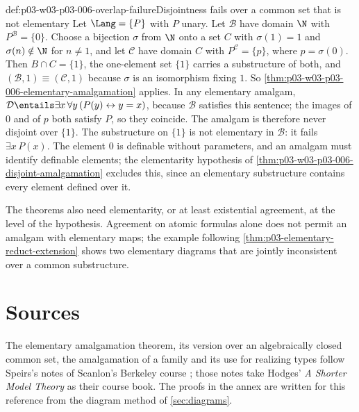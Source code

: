 \begin{hbwarning}{def:p03-w03-p03-006-overlap-failure}{Disjointness fails over a common set that is not elementary}
Let \(\Lang=\{P\}\) with \(P\) unary.  Let \(\mathcal B\) have domain
\(\N\) with \(P^{\mathcal B}=\{0\}\).  Choose a bijection \(\sigma\) from
\(\N\) onto a set \(C\) with \(\sigma(1)=1\) and \(\sigma(n)\notin\N\) for
\(n\ne 1\), and let \(\mathcal C\) have domain \(C\) with
\(P^{\mathcal C}=\{p\}\), where \(p=\sigma(0)\).  Then \(B\cap C=\{1\}\),
the one-element set \(\{1\}\) carries a substructure of both, and
\((\mathcal B,1)\equiv(\mathcal C,1)\) because \(\sigma\) is an isomorphism
fixing \(1\).  So
\cref{thm:p03-w03-p03-006-elementary-amalgamation} applies.  In any
elementary amalgam, \(\mathcal D\entails\exists x\,\forall y\,(P(y)\leftrightarrow y=x)\),
because \(\mathcal B\) satisfies this sentence; the images of \(0\) and of
\(p\) both satisfy \(P\), so they coincide.  The amalgam is therefore never
disjoint over \(\{1\}\).  The substructure on \(\{1\}\) is not elementary in
\(\mathcal B\): it fails \(\exists x\,P(x)\).  The element \(0\) is
definable without parameters, and an amalgam must identify definable
elements; the elementarity hypothesis of
\cref{thm:p03-w03-p03-006-disjoint-amalgamation} excludes this, since an
elementary substructure contains every element defined over it.
\end{hbwarning}

The theorems also need elementarity, or at least existential agreement, at
the level of the hypothesis.  Agreement on atomic formulas alone does not
permit an amalgam with elementary maps; the example following
\cref{thm:p03-elementary-reduct-extension} shows two elementary diagrams
that are jointly inconsistent over a common substructure.

\section{Sources}
\label{sec:p03-w03-p03-006-sources}

The elementary amalgamation theorem, its version over an algebraically
closed common set, the amalgamation of a family and its use for realizing
types follow Speirs's notes of Scanlon's Berkeley course
\cite[Lecture~19, pp.~1--6]{Speirs2013Amalgamation}; those notes take
Hodges' \emph{A Shorter Model Theory} as their course book.  The proofs in
the annex are written for this reference from the diagram method of
\cref{sec:diagrams}.
